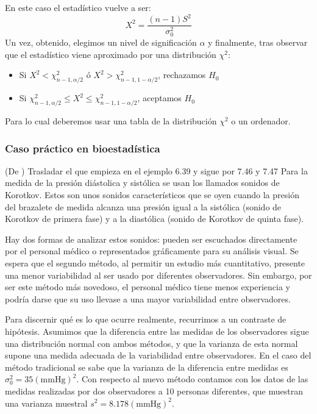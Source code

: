 \documentclass[a4paper,12pt]{article}
\begin{document}
En este caso el estadístico vuelve a ser: 
$$X^2=\frac{(n-1)S^2}{\sigma_0^2}$$
Un vez, obtenido, elegimos un nivel de significación $\alpha$ y finalmente, tras observar que el estadístico viene aproximado por una distribución $\chi^2$:
\begin{itemize}
	\item Si $X^2<\chi^2_{n-1,\alpha/2}$ ó $X^2>\chi^2_{n-1,1-\alpha/2}$, rechazamos $H_0$
	\item Si $\chi^2_{n-1,\alpha/2}\leq X^2\leq\chi^2_{n-1,1-\alpha/2}$, aceptamos $H_0$
\end{itemize}
Para lo cual deberemos usar una tabla de la distribución $\chi^2$ o un ordenador.

\subsubsection*{Caso práctico en bioestadística}
(De \cite{rosner2015fundamentals}) Trasladar el que empieza en el ejemplo 6.39 y sigue por 7.46 y 7.47
    Para la medida de la presión diástolica y sistólica se usan los llamados sonidos de Korotkov. 
    Estos son unos sonidos característicos que se oyen cuando la presión del brazalete de medida alcanza una presión igual a la sistólica (sonido de Korotkov de primera fase) y a la diastólica (sonido de Korotkov de quinta fase).

    Hay dos formas de analizar estos sonidos: pueden ser escuchados directamente por el personal médico o representados gráficamente para su análisis visual.
    Se espera que el segundo método, al permitir un estudio más cuantitativo, presente una menor variabilidad al ser usado por diferentes observadores.
    Sin embargo, por ser este método más novedoso, el personal médico tiene menos experiencia y podría darse que su uso llevase a una mayor variabilidad entre observadores.

    Para discernir qué es lo que ocurre realmente, recurrimos a un contraste de hipótesis. 
    Asumimos que la diferencia entre las medidas de los observadores sigue una distribución normal con ambos métodos, y que la varianza de esta normal supone una medida adecuada de la variabilidad entre observadores.
    En el caso del método tradicional se sabe que la varianza de la diferencia entre medidas es $\sigma_0^2=35 (\textrm{mmHg})^2$.
    Con respecto al nuevo método contamos con los datos de las medidas realizadas por dos observadores a 10 personas diferentes, que muestran una varianza muestral $s^2 = 8.178 (\textrm{mmHg})^2$.
\end{document}
